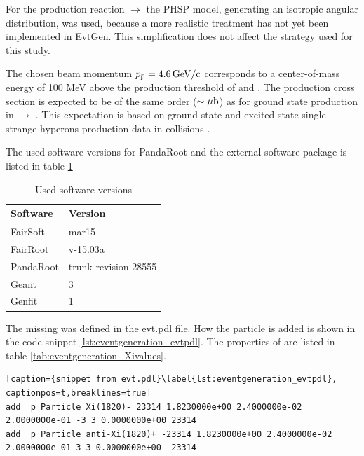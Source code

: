 For the production reaction \pbarpSystem $\rightarrow$ \excitedcascade\anticascade the PHSP model, 
generating an isotropic angular distribution, was used,
because a more realistic treatment has not yet been implemented in EvtGen. 
This simplification does not affect the strategy used for this study.

The chosen beam momentum $p_{\bar{\textnormal{p}}} = 4.6\, \textnormal{GeV/c}$ corresponds to a center-of-mass energy 
of 100 MeV above the production threshold of \excitedcascade and \anticascade.
The production cross section is expected to be of the same order ($\sim \mu\textnormal{b}$) as for ground 
state \cascade production in \pbarpSystem $\rightarrow$ \cascade\anticascade \cite{PANDAphysics2009}.
This expectation is based on ground state and excited state single strange hyperons production data in \pbarpSystem collisions \cite{CERN}.
\\
\vspace{11pt} 

The used software versions for PandaRoot and the external software package is listed in table \ref{tab:eventgeneration_software} 

\begin{table}[tb]
	\centering
	\caption{Used software versions}
	\label{tab:eventgeneration_software}
	\begin{tabular}{ll}
		\hline
		Software & Version \\
		\hline
		\hline
		FairSoft & mar15\\
		FairRoot & v-15.03a \\
		PandaRoot & trunk revision 28555 \\
		Geant & 3\\
		Genfit & 1\\\hline
			 
	\end{tabular}
\end{table}


The missing \excitedcascade was defined in the evt.pdl file. 
How the particle is added is shown in the code snippet \ref{lst:eventgeneration_evtpdl}.
The properties of \excitedcascade are listed in table \ref{tab:eventgeneration_Xivalues}.

\begin{lstlisting}[caption={snippet from evt.pdl}\label{lst:eventgeneration_evtpdl}, captionpos=t,breaklines=true]
add  p Particle Xi(1820)- 23314 1.8230000e+00 2.4000000e-02 2.0000000e-01 -3 3 0.0000000e+00 23314
add  p Particle anti-Xi(1820)+ -23314 1.8230000e+00 2.4000000e-02 2.0000000e-01 3 3 0.0000000e+00 -23314
\end{lstlisting}

